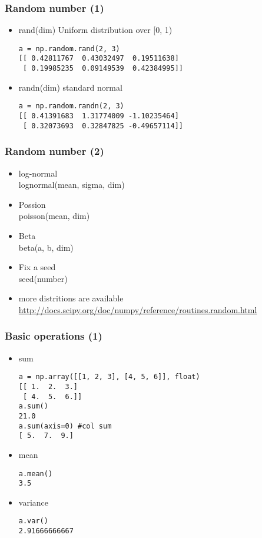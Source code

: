 \documentclass{beamer}
\begin{document}
\begin{frame}[fragile]
\frametitle{Random number (1)}
\begin{itemize}
\item rand(dim) Uniform distribution over [0, 1)
\begin{lstlisting}
a = np.random.rand(2, 3)
[[ 0.42811767  0.43032497  0.19511638]
 [ 0.19985235  0.09149539  0.42384995]]
\end{lstlisting}
\item randn(dim) standard normal
\begin{lstlisting}
a = np.random.randn(2, 3)
[[ 0.41391683  1.31774009 -1.10235464]
 [ 0.32073693  0.32847825 -0.49657114]]
\end{lstlisting}
\end{itemize}
\end{frame}

\begin{frame}[fragile]
\frametitle{Random number (2)}
\begin{itemize}
\item log-normal \\
lognormal(mean, sigma, dim)
\item Possion \\ 
poisson(mean, dim)
\item Beta \\ 
beta(a, b, dim)
\item Fix a seed \\ 
seed(number)
\item more distritions are available \\
\url{http://docs.scipy.org/doc/numpy/reference/routines.random.html}
\end{itemize}
\end{frame}

\begin{frame}[fragile]
\frametitle{Basic operations (1)}
\begin{itemize}
\item sum
\begin{lstlisting}
a = np.array([[1, 2, 3], [4, 5, 6]], float)
[[ 1.  2.  3.]
 [ 4.  5.  6.]]
a.sum()
21.0
a.sum(axis=0) #col sum
[ 5.  7.  9.]
\end{lstlisting}
\item mean
\begin{lstlisting}
a.mean()
3.5
\end{lstlisting}
\item variance
\begin{lstlisting}
a.var()
2.91666666667
\end{lstlisting}
\end{itemize}
\end{frame}
\end{document}
